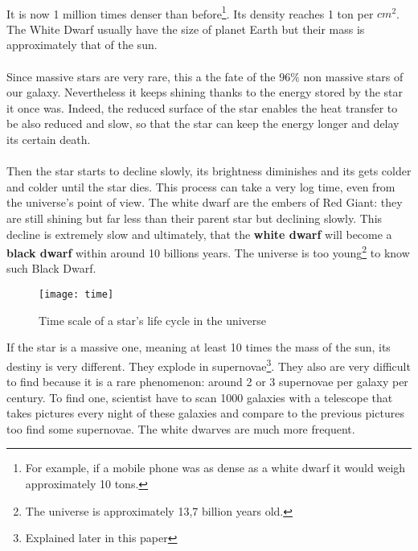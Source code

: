\documentclass[a4paper, 11pt]{article} %
\begin{document}
\paragraph*{}
 It is now 1 million times denser than before\footnote{For example, if a mobile phone was as dense as a white dwarf it would weigh approximately 10 tons.}. Its density reaches 1 ton per $cm^2$. The White Dwarf usually have the size of planet Earth but their mass is approximately that of the sun.

\paragraph*{}

Since massive stars are very rare, this a the fate of the $96\%$ non massive stars of our galaxy. 
Nevertheless it keeps shining thanks to the energy stored by the star it once was. Indeed, the reduced surface of the star enables the heat transfer to be also reduced and slow, so that the star can keep the energy longer and delay its certain death.
\paragraph*{}

Then the star starts to decline slowly, its brightness diminishes and its gets colder and colder until the star dies. This process can take a very log time, even from the universe's point of view. 
The white dwarf are the embers of Red Giant: they are still shining but far less than their parent star but declining slowly.
This decline is extremely slow and ultimately, that the \textbf{white dwarf} will become a \textbf{black dwarf} within around 10 billions years. The universe is too young\footnote{The universe is approximately 13,7 billion years old.} to know such Black Dwarf. 


\begin{figure}[h]
\centering
\texttt{[image: time]}
\caption{Time scale of a star's life cycle in the universe}
\end{figure}

If the star is a massive one, meaning at least 10 times the mass of the sun, its destiny is very different. They explode in supernovae\footnote{Explained later in this paper}. They also are very difficult to find because it is a rare phenomenon: around 2 or 3 supernovae per galaxy per century. To find one, scientist have to scan 1000 galaxies with a telescope that takes pictures every night of these galaxies and compare to the previous pictures too find some supernovae. The white dwarves are much more frequent.
\end{document}

